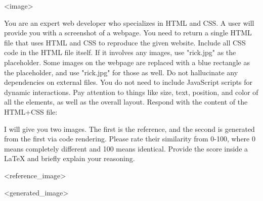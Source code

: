 \begin{tcolorbox}[
  title=Design2Code (Generation),
  fonttitle=\bfseries,
  colframe=black,
  colback=white,
  toptitle=1mm,
  bottomtitle=1mm,
  top=2mm,
  verbatim,
]
<image>

You are an expert web developer who specializes in HTML and CSS.
A user will provide you with a screenshot of a webpage.
You need to return a single HTML file that uses HTML and CSS to reproduce the given website.
Include all CSS code in the HTML file itself.
If it involves any images, use "rick.jpg" as the placeholder.
Some images on the webpage are replaced with a blue rectangle as the placeholder, and use "rick.jpg" for those as well.
Do not hallucinate any dependencies on external files. You do not need to include JavaScript scripts for dynamic interactions.
Pay attention to things like size, text, position, and color of all the elements, as well as the overall layout.
Respond with the content of the HTML+CSS file:
\end{tcolorbox}

\begin{tcolorbox}[
  title=Design2Code (GPT-o4-mini Evaluation),
  fonttitle=\bfseries,
  colframe=black,
  colback=white,
  toptitle=1mm,
  bottomtitle=1mm,
  top=2mm,
  verbatim,
]
I will give you two images. The first is the reference, and the second is generated from the first via code rendering. Please rate their similarity from 0-100, where 0 means completely different and 100 means identical. Provide the score inside a LaTeX \boxed{} and briefly explain your reasoning.

<reference\_image>

<generated\_image>
\end{tcolorbox}


